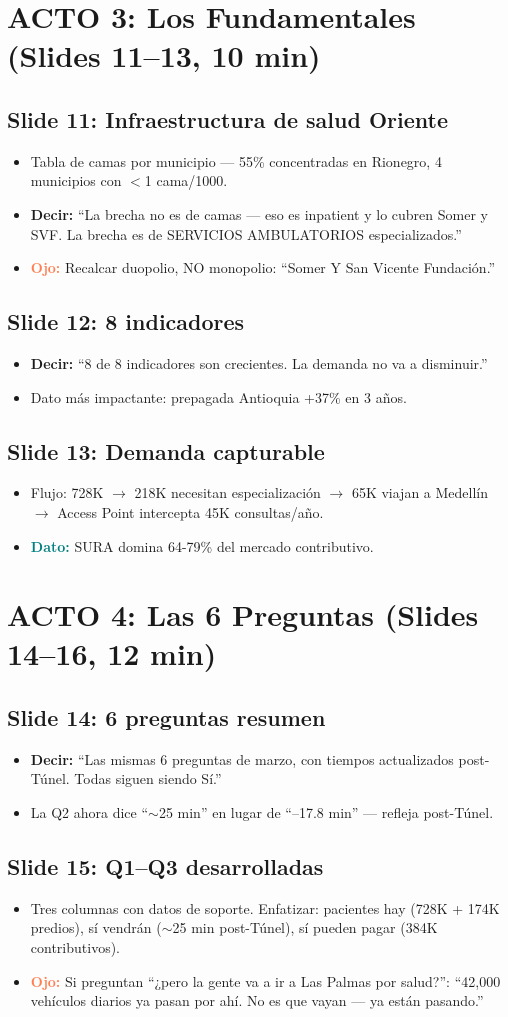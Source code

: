 \documentclass[11pt, a4paper]{article}
\newcommand{\slide}[2]{\subsection{Slide #1: #2}}
\newcommand{\say}[1]{\textcolor{hptu}{\textbf{Decir:}} ``#1''}
\newcommand{\dato}[1]{\textcolor{teal}{\textbf{Dato:}} #1}
\newcommand{\warn}[1]{\textcolor{coral}{\textbf{Ojo:}} #1}
\begin{document}
\section{ACTO 3: Los Fundamentales (Slides 11--13, 10 min)}

\slide{11}{Infraestructura de salud Oriente}
\begin{itemize}[leftmargin=1cm]
  \item Tabla de camas por municipio --- 55\% concentradas en Rionegro, 4 municipios con $<$1 cama/1000.
  \item \say{La brecha no es de camas --- eso es inpatient y lo cubren Somer y SVF. La brecha es de SERVICIOS AMBULATORIOS especializados.}
  \item \warn{Recalcar duopolio, NO monopolio: ``Somer Y San Vicente Fundación.''}
\end{itemize}

\slide{12}{8 indicadores}
\begin{itemize}[leftmargin=1cm]
  \item \say{8 de 8 indicadores son crecientes. La demanda no va a disminuir.}
  \item Dato más impactante: prepagada Antioquia +37\% en 3 años.
\end{itemize}

\slide{13}{Demanda capturable}
\begin{itemize}[leftmargin=1cm]
  \item Flujo: 728K $\to$ 218K necesitan especialización $\to$ 65K viajan a Medellín $\to$ Access Point intercepta 45K consultas/año.
  \item \dato{SURA domina 64-79\% del mercado contributivo.}
\end{itemize}

\section{ACTO 4: Las 6 Preguntas (Slides 14--16, 12 min)}

\slide{14}{6 preguntas resumen}
\begin{itemize}[leftmargin=1cm]
  \item \say{Las mismas 6 preguntas de marzo, con tiempos actualizados post-Túnel. Todas siguen siendo Sí.}
  \item La Q2 ahora dice ``$\sim$25 min'' en lugar de ``--17.8 min'' --- refleja post-Túnel.
\end{itemize}

\slide{15}{Q1--Q3 desarrolladas}
\begin{itemize}[leftmargin=1cm]
  \item Tres columnas con datos de soporte. Enfatizar: pacientes hay (728K + 174K predios), sí vendrán ($\sim$25 min post-Túnel), sí pueden pagar (384K contributivos).
  \item \warn{Si preguntan ``¿pero la gente va a ir a Las Palmas por salud?'': ``42,000 vehículos diarios ya pasan por ahí. No es que vayan --- ya están pasando.''}
\end{itemize}
\end{document}
